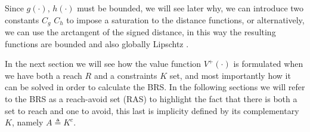 Since $g(\cdot)$, $h(\cdot)$ must be bounded, we will see later why, we can introduce two constants $C_g$ $C_h$ to impose a saturation to the distance functions, or alternatively, we can use the arctangent of the signed distance, in this way the resulting functions are bounded and also globally Lipschtz \cite{reach_avoid_no_dist}. 

In the next section we will see how the value function $V^+(\cdot)$ is formulated when we have both a reach $R$ and a constraints $K$ set, and most importantly how it can be solved in order to calculate the BRS. In the following sections we will refer to the BRS as a reach-avoid set (RAS) to highlight the fact that there is both a set to reach and one to avoid, this last is implicity defined by its complementary $K$, namely $A \triangleq K^c$.

\begin{comment}	
The lower value of the game is given by the following value function $V(x,t)$ in which the control $u$ tries to minimize and the disturbance $d$ to maximize the cost $J(\cdot)$.
We assume that the player that wants to reach the target set $R$, namely the control input $u$ (Player 1), is restricted to use a non-anticipative strategies $\gamma[d](t)$ and we indicates the class of strategies admissible in a time interval $[\tau_i, \tau_f]$ as $\Gamma_{[\tau_i, \tau_f]}$.

\begin{equation}
\begin{split}
    V(x, t) 
    & = \inf_{\gamma(\cdot) \in \Gamma(\cdot) } \sup_{d(\cdot)} J(x, t, \gamma(\cdot), d(\cdot))    \\
    & = \inf_{\gamma(\cdot) \in \Gamma(\cdot) } \sup_{d(\cdot)} g(x(\tau_f))
\end{split}
\end{equation}


In practical scenarios, along the trajectory of a dynamical system there may be both goals to reach and obstacles to avoid. The goals to reach can be represented by the target set $R$ as previously done, the set of states to avoid instead, can be defined with another set $A$ (avoid) that contains all the system state $x$ that corresponds to an object collision, this new kind of set can be defined using a function $h(x)$ similar to $g(x)$. Formally: consider the sets $R$, $A$ related respectively to the level sets of two Lipschitz continuous and bounded functions $g: \mathbb{R}^n \rightarrow \mathbb{R}$, $h: \mathbb{R}^n \rightarrow \mathbb{R}$, then the two sets can be characterized as:


\end{comment}
